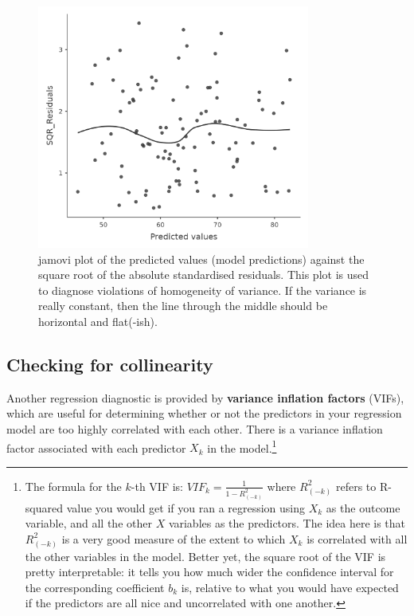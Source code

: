 \documentclass[
  a4paper,
]{book}
\begin{document}
\begin{figure}[h!]

\includegraphics[width=0.8\textwidth,height=\textheight]{images/fig12-21.png} \hfill{}

\caption{\label{fig-fig12-21}jamovi plot of the predicted values (model
predictions) against the square root of the absolute standardised
residuals. This plot is used to diagnose violations of homogeneity of
variance. If the variance is really constant, then the line through the
middle should be horizontal and flat(-ish).}

\end{figure}

\hypertarget{checking-for-collinearity}{%
\subsection{Checking for collinearity}\label{checking-for-collinearity}}

Another regression diagnostic is provided by \textbf{variance inflation
factors} (VIFs), which are useful for determining whether or not the
predictors in your regression model are too highly correlated with each
other. There is a variance inflation factor associated with each
predictor \(X_k\) in the model.\footnote{The formula for the \(k\)-th
  VIF is: \(VIF_k=\frac{1}{1-R^2_{(-k)}}\) where \(R^2_{(-k)}\) refers
  to R-squared value you would get if you ran a regression using \(X_k\)
  as the outcome variable, and all the other \(X\) variables as the
  predictors. The idea here is that \(R^2_{(-k)}\) is a very good
  measure of the extent to which \(X_k\) is correlated with all the
  other variables in the model. Better yet, the square root of the VIF
  is pretty interpretable: it tells you how much wider the confidence
  interval for the corresponding coefficient \(b_k\) is, relative to
  what you would have expected if the predictors are all nice and
  uncorrelated with one another.}
\end{document}
